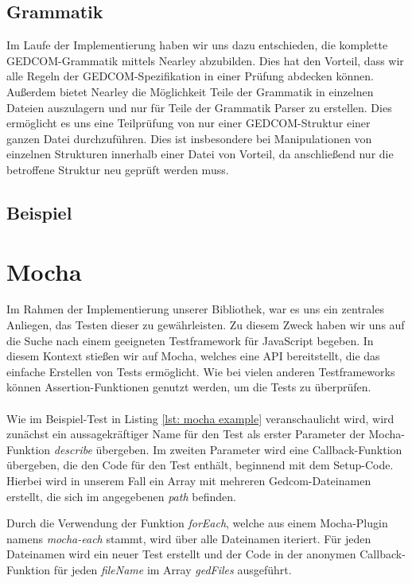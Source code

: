\subsection*{Grammatik}
Im Laufe der Implementierung haben wir uns dazu entschieden, die komplette GEDCOM-Grammatik mittels Nearley abzubilden. Dies hat den Vorteil, dass wir 
alle Regeln der GEDCOM-Spezifikation in einer Prüfung abdecken können. Außerdem bietet Nearley die Möglichkeit Teile der Grammatik in einzelnen Dateien
auszulagern und nur für Teile der Grammatik Parser zu erstellen. Dies ermöglicht es uns eine Teilprüfung von nur einer GEDCOM-Struktur einer
ganzen Datei durchzuführen. Dies ist insbesondere bei Manipulationen von einzelnen Strukturen innerhalb einer Datei von Vorteil, da anschließend
nur die betroffene Struktur neu geprüft werden muss.

\subsection*{Beispiel}


\section{Mocha}
\label{sec: Mocha}

Im Rahmen der Implementierung unserer Bibliothek, war es uns ein zentrales Anliegen, das Testen dieser zu gewährleisten. Zu diesem Zweck haben wir uns 
auf die Suche nach einem geeigneten Testframework für JavaScript begeben. In diesem Kontext stießen wir auf Mocha, welches eine API bereitstellt, die
 das einfache Erstellen von Tests ermöglicht. Wie bei vielen anderen Testframeworks können Assertion-Funktionen genutzt werden, um die Tests zu überprüfen.
\\\\
Wie im Beispiel-Test in Listing \ref{lst: mocha example} veranschaulicht wird, wird zunächst ein aussagekräftiger Name für den Test als erster Parameter
 der Mocha-Funktion \textit{describe} übergeben. Im zweiten Parameter wird eine Callback-Funktion übergeben, die den Code für den Test enthält, beginnend
  mit dem Setup-Code. Hierbei wird in unserem Fall ein Array mit mehreren Gedcom-Dateinamen erstellt, die sich im angegebenen \textit{path} befinden.

Durch die Verwendung der Funktion \textit{forEach}, welche aus einem Mocha-Plugin namens \textit{mocha-each} stammt, wird über alle Dateinamen iteriert. 
Für jeden Dateinamen wird ein neuer Test erstellt und der Code in der anonymen Callback-Funktion für jeden \textit{fileName} im Array \textit{gedFiles} 
ausgeführt.

